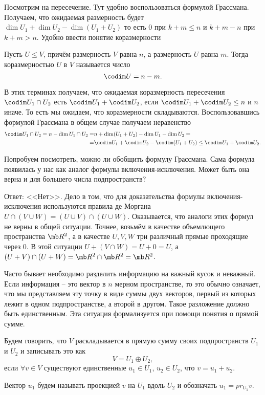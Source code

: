 Посмотрим на пересечение. Тут удобно воспользоваться формулой Грассмана. Получаем, что ожидаемая размерность будет $\dim U_1 + \dim U_2 - \dim (U_1+U_2)$ то есть $0$ при $k+m \leq n$ и $k+m-n$ при $k+m>n$. Удобно ввести понятие коразмерности 

\dfn Пусть $U\leq V$, причём размерность $V$ равна $n$, а размерность $U$ равна $m$. Тогда коразмерностью $U$  в $V$ называется число  
$$\codim U =n-m.$$
\edfn

В этих терминах получаем, что ожидаемая коразмерность пересечения $\codim U_1\cap U_2$ есть $\codim U_1 + \codim U_2$, если $\codim U_1 + \codim U_2 \leq n$ и $n$ иначе. То есть мы ожидаем, что коразмерности складываются. Воспользовавшись формулой Грассмана в общем случае получаем неравенство
\begin{align*} \codim U_1 \cap U_2 = n -\dim U_1 \cap U_2=& n+\dim (U_1+U_2)-\dim U_1-\dim U_2=\\
=&\codim U_1+\codim U_2 - \codim (U_1 +U_2) \leq \codim U_1+\codim U_2.
\end{align*}

Попробуем посмотреть, можно ли обобщить формулу Грассмана. Сама формула появилась у нас как аналог формулы включения-исключения. Может быть она верна и для большего числа подпространств? 

Ответ: <<Нет>>. Дело в том, что для доказательства формулы включения-исключения используются правила де Моргана $U\cap (V \cup W)=(U\cup V)\cap (U\cup W)$. Оказывается, что аналоги этих формул не верны в общей ситуации. Точнее, возьмём в качестве объемлющего пространства  $\mb R^2$, а в качестве $U,V,W$ три различный прямые проходящие через 0. В этой ситуации $U + (V \cap W)=U+0=U$, а $(U+V)\cap(U+W)=\mb R^2 \cap \mb R^2= \mb R^2$. 


Часто бывает необходимо разделить информацию на важный кусок и неважный. Если информация -- это вектор в $n$ мерном пространстве, то это обычно означает, что мы представляем эту точку в виде суммы двух векторов, первый из которых лежит в одном подпространстве, а второй в другом. Такое разложение должно быть единственным. Эта ситуация формализуется при помощи понятия о прямой сумме.

\dfn Будем говорить, что $V$ раскладывается в прямую сумму своих подпространств $U_1$ и $U_2$ и записывать это как
$$V=U_1\oplus U_2,$$
если $\forall v\in V$ существуют единственные $u_1\in U_1$, $u_2\in U_2$, что $v=u_1+u_2$.
\edfn

Вектор $u_1$ будем называть проекцией $v$ на $U_1$ вдоль $U_2$ и обозначать $u_1=pr_{U_1}v$.

